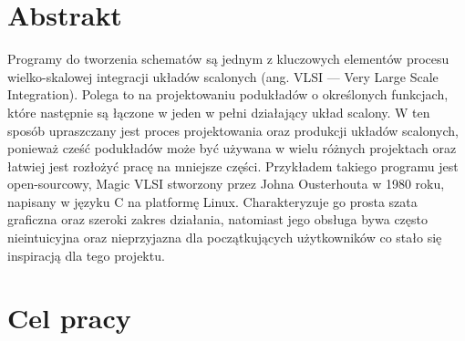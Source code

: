 \section{Abstrakt}

Programy do tworzenia schematów są jednym z kluczowych elementów
procesu wielko-skalowej integracji układów scalonych (ang. VLSI — Very Large Scale Integration)\cite{VLSI}.
Polega to na projektowaniu podukładów o określonych funkcjach,
które następnie są łączone w jeden w pełni działający układ scalony.
W ten sposób upraszczany jest proces projektowania oraz produkcji układów scalonych,
ponieważ cześć podukładów może być używana w wielu różnych projektach
oraz łatwiej jest rozłożyć pracę na mniejsze części.
Przykładem takiego programu jest open-sourcowy, Magic VLSI stworzony przez Johna Ousterhouta w 1980 roku\cite{MAGIC},
napisany w języku C na platformę Linux\cite{MAGIC_wiki}.
Charakteryzuje go prosta szata graficzna oraz szeroki zakres działania,
natomiast jego obsługa bywa często nieintuicyjna oraz nieprzyjazna dla początkujących użytkowników
co stało się inspiracją dla tego projektu.

\section{Cel pracy}